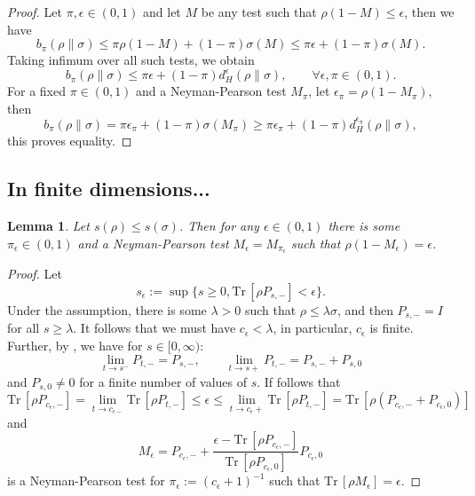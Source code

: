 \documentclass[12pt]{article}
\newtheorem{lemma}{Lemma}
\theoremstyle{definition}
\theoremstyle{remark}
\def \Tr{\mathrm{Tr}\,}
\begin{document}
\begin{proof}
Let $\pi,\epsilon \in (0,1)$ and let $M$ be any test such that $\rho(1-M)\le
\epsilon$, then we have
\[
b_\pi(\rho\|\sigma)\le \pi\rho(1-M)+(1-\pi)\sigma(M)\le
\pi\epsilon+(1-\pi)\sigma(M).
\]
Taking infimum over all such tests, we obtain
\begin{equation}\label{eq:bled}
b_\pi(\rho\|\sigma)\le \pi\epsilon +(1-\pi)d_H^\epsilon(\rho\|\sigma),\qquad \forall
\epsilon,\pi\in (0,1).
\end{equation}
For a fixed $\pi\in (0,1)$ and a Neyman-Pearson test $M_\pi$, let
$\epsilon_\pi=\rho(1-M_\pi)$, then
\[
b_\pi(\rho\|\sigma)=\pi\epsilon_\pi+(1-\pi)\sigma(M_\pi)\ge
\pi\epsilon_\pi+(1-\pi)d_H^{\epsilon_\pi}(\rho\|\sigma),
\]
this proves equality. 

\end{proof}

\subsection{In finite dimensions...}


\begin{lemma}\label{lemma:NPepsilon} Let $s(\rho)\le s(\sigma)$. Then for any $\epsilon\in
(0,1)$ there is some $\pi_\epsilon\in (0,1)$ and a Neyman-Pearson test
$M_\epsilon=M_{\pi_\epsilon}$ such that $\rho(1- M_\epsilon)=\epsilon$.

\end{lemma}

\begin{proof} Let 
\[
s_\epsilon:=\sup\{s\ge0, \Tr[\rho P_{s,-}]< \epsilon\}.
\]
Under the assumption, there is some
$\lambda>0$ such that $\rho\le \lambda \sigma$, and  then $P_{s,-}=I$ for all $s\ge
\lambda$. It follows that we must have $c_\epsilon<\lambda$, in particular, $c_\epsilon$
is finite. Further, by  \cite[Lemma ]{jencova2012reversibility}, we have for $s\in [0,\infty)$:
\[
\lim_{t\to s^-} P_{t,-}=P_{s,-},\qquad \lim_{t\to s+}P_{t,-}=P_{s,-}+P_{s,0}
\]
and $P_{s,0}\ne 0$ for a finite number of values of $s$. If follows that
\[
\Tr[\rho
P_{c_\epsilon,-}]=\lim_{t\to c_{\epsilon-}}\Tr[\rho P_{t,-}]\le \epsilon \le \lim_{t\to c_\epsilon+}\Tr[\rho
P_{t,-}]=\Tr[\rho(P_{c_\epsilon,-}+P_{c_\epsilon,0})]
\]
and 
\[
M_\epsilon=P_{c_\epsilon,-}+\frac{\epsilon- \Tr[\rho P_{c_\epsilon,-}]}{\Tr[\rho
P_{c_\epsilon,0}]}P_{c_\epsilon,0}
\]
is a Neyman-Pearson test for $\pi_\epsilon:=(c_\epsilon+1)^{-1}$ such that $\Tr[\rho
M_\epsilon]=\epsilon$.



\end{proof}
\end{document}
